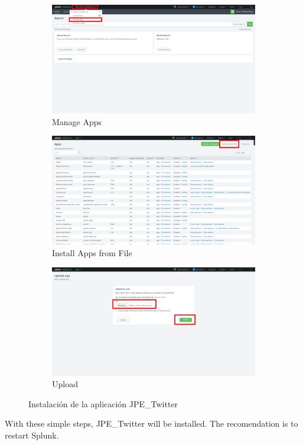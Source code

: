 \documentclass[report]{article}
\begin{document}
\begin{figure}[h!]
  \centering
  \begin{subfigure}[b]{0.49\linewidth}
    \includegraphics[width=\linewidth]{img/a.png}
     \caption{\color{text} Manage Apps}
  \end{subfigure}
  \begin{subfigure}[b]{0.49\linewidth}
    \includegraphics[width=\linewidth]{img/b.png}
    \caption{\color{text} Install Apps from File}
  \end{subfigure}
  \begin{subfigure}[b]{0.49\linewidth}
    \includegraphics[width=\linewidth]{img/c.png}
    \caption{\color{text} Upload}
  \end{subfigure}
  \caption{\color{text} Instalaci\'on de la aplicaci\'on JPE\_Twitter}
  \label{fig:instalacion}
\end{figure}
With these simple steps, JPE\_Twitter will be installed. The recomendation is to restart Splunk.
\newpage
\end{document}
